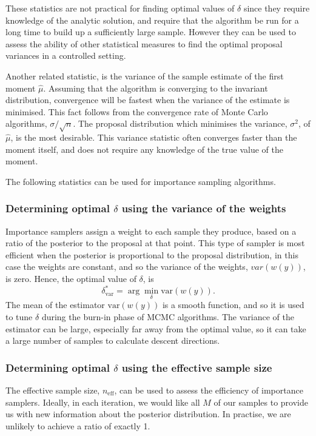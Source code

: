 \documentclass[final]{siamltex}
\newcommand{\neff}{n_{\text{eff}}}
\begin{document}
These statistics are not practical for finding optimal values of
$\delta$ since they require knowledge of the analytic solution, and
require that the algorithm be run for a long time to build up a
sufficiently large sample. However they can be used to assess the
ability of other statistical measures to find the optimal proposal
variances in a controlled setting.

Another related statistic, is the variance of the sample estimate of the first moment $\hat{\mu}$. Assuming that the algorithm is converging to the invariant distribution, convergence will be fastest when the variance of the estimate is minimised. This fact follows from the convergence rate of Monte Carlo algorithms, $\sigma/\sqrt{n}$. The proposal distribution which minimises the variance, $\sigma^2$, of $\hat{\mu}$, is the most desirable. This variance statistic often converges faster than the moment itself, and does not require any knowledge of the true value of the moment.

The following statistics can be used for importance sampling algorithms.

\subsubsection{Determining optimal $\delta$ using the variance of the weights}

Importance samplers assign a weight to each sample they produce, based on a ratio of the posterior to the proposal at that point. This type of sampler is most efficient when the posterior is proportional to the proposal distribution, in this case the weights are constant, and so the variance of the weights, $var(w(y))$, is zero. Hence, the optimal value of $\delta$, is
\[
	\delta^*_{\text{var}} = \arg\min_{\delta} \text{var}(w(y)).
\]
The mean of the estimator $\text{var}(w(y))$ is a smooth function, and so it is used to tune $\delta$ during the burn-in phase of MCMC algorithms. The variance of the estimator can be large, especially far away from the optimal value, so it can take a large number of samples to calculate descent directions.

\subsubsection{Determining optimal $\delta$ using the effective sample size}\label{sec:ess}

The effective sample size, $\neff$, can be used to assess the efficiency of importance samplers. Ideally, in each iteration, we would like all $M$ of our samples to provide us with new information about the posterior distribution. In practise, we are unlikely to achieve a ratio of exactly 1.
\end{document}
